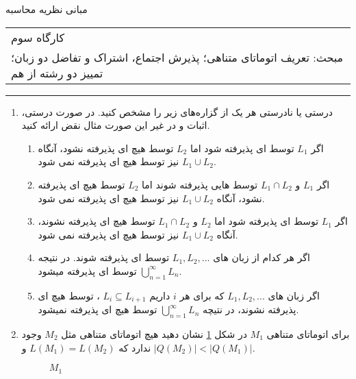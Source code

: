 \documentclass{article}
\begin{document}
	\begin{center}
		\Huge
		مبانی نظریه محاسبه
	\end{center}
	\Large
	\begin{tabularx}{\linewidth}{>{\raggedleft\arraybackslash}X}
		کارگاه سوم
		\\
		مبحث: تعریف اتوماتای متناهی؛ پذیرش اجتماع، اشتراک و تفاضل دو زبان؛ 
		 تمییز
		 \LTRfootnote{distinguishability}
		 دو رشته از هم
		\\
		
	\end{tabularx}
	\rule{\textwidth}{1pt}
	\large
	\begin{enumerate}
		\item 
				درستی یا نادرستی هر یک از گزاره‌های زیر را مشخص کنید. در صورت درستی، اثبات و در غیر این صورت مثال نقض ارائه کنید.
		\begin{enumerate}
			\item 
			اگر $L_1 $ توسط  ای پذیرفته شود اما $L_2 $ توسط هیچ  ای پذیرفته نشود، آنگاه $ L_1 \cup L_2 $ نیز توسط هیچ  ای پذیرفته نمی شود.
			\item 
			اگر $L_1 $ و $ L_1 \cap L_2 $ توسط  هایی پذیرفته شوند اما $L_2 $ توسط هیچ  ای پذیرفته نشود، آنگاه $ L_1 \cup L_2 $ نیز توسط هیچ  ای پذیرفته نمی شود.
			\item 
			اگر $L_1 $ توسط  ای پذیرفته شود اما $L_2 $ و $ L_1 \cap L_2 $ توسط هیچ  ای پذیرفته نشوند، آنگاه $ L_1 \cup L_2 $ نیز توسط هیچ  ای پذیرفته نمی شود.
			\item 
		اگر هر کدام از زبان های
		$L_1, L_2 , ...$  
		توسط  ای پذیرفته شوند. در نتیجه
		$ \bigcup_{n = 1}^{\infty} L_n$
		 توسط  ای پذیرفته میشود.
			\item 
	اگر زبان های
	$L_1, L_2 , ...$
	که برای هر $i$ داریم 
	$L_i \subseteq L_{i+1} $ 
		، توسط هیچ  ای پذیرفته نشوند، در نتیچه
		$ \bigcup_{n = 1}^{\infty} L_n$
		  توسط هیچ  ای پذیرفته نمیشود.
			
		\end{enumerate}	
			
			
		\item 
 		برای اتوماتای متناهی $M_1$ در شکل  \ref{M1} نشان دهید هیچ اتوماتای متناهی مثل $ M_2 $ وجود ندارد که $L(M_1) = L(M_2)$ و $|Q(M_2)|<|Q(M_1)|$.
		\begin{figure}[h]
			\begin{minipage}{1\textwidth}
				\centering
				\caption{$M_1$}
				\label{M1}
			\end{minipage}%
		\end{figure}
		

\end{enumerate}
\end{document}
